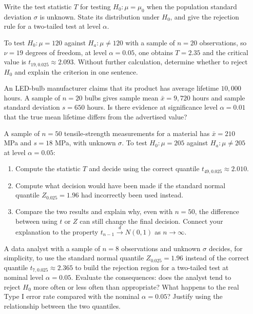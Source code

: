 \begin{problema}\label{prob:b3d462b}
Write the test statistic $T$ for testing $H_0:\mu=\mu_0$ when the population standard deviation $\sigma$ is unknown. State its distribution under $H_0$, and give the rejection rule for a two-tailed test at level $\alpha$.
\end{problema}

\begin{problema}\label{prob:313cd70}
To test $H_0:\mu=120$ against $H_a:\mu\ne120$ with a sample of $n=20$ observations, so $\nu=19$ degrees of freedom, at level $\alpha=0.05$, one obtains $T=2.35$ and the critical value is $t_{19,0.025}\approx2.093$. Without further calculation, determine whether to reject $H_0$ and explain the criterion in one sentence.
\end{problema}

\begin{problema}\label{prob:50f5282}
An LED-bulb manufacturer claims that its product has average lifetime $10{,}000$ hours. A sample of $n=20$ bulbs gives sample mean $\bar x=9{,}720$ hours and sample standard deviation $s=650$ hours. Is there evidence at significance level $\alpha=0.01$ that the true mean lifetime differs from the advertised value?
\end{problema}

\begin{problema}\label{prob:8d10618}
A sample of $n=50$ tensile-strength measurements for a material has $\bar x=210$ MPa and $s=18$ MPa, with unknown $\sigma$. To test $H_0:\mu=205$ against $H_a:\mu\ne205$ at level $\alpha=0.05$:
\begin{enumerate}[label=(\alph*)]
	\item Compute the statistic $T$ and decide using the correct quantile $t_{49,0.025}\approx2.010$.
	\item Compute what decision would have been made if the standard normal quantile $Z_{0.025}=1.96$ had incorrectly been used instead.
	\item Compare the two results and explain why, even with $n=50$, the difference between using $t$ or $Z$ can still change the final decision. Connect your explanation to the property $t_{n-1}\xrightarrow{d}N(0,1)$ as $n\to\infty$.
\end{enumerate}
\end{problema}

\begin{problema}\label{prob:1faa4e6}
A data analyst with a sample of $n=8$ observations and unknown $\sigma$ decides, for simplicity, to use the standard normal quantile $Z_{0.025}=1.96$ instead of the correct quantile $t_{7,0.025}\approx2.365$ to build the rejection region for a two-tailed test at nominal level $\alpha=0.05$. Evaluate the consequences: does the analyst tend to reject $H_0$ more often or less often than appropriate? What happens to the real Type I error rate compared with the nominal $\alpha=0.05$? Justify using the relationship between the two quantiles.
\end{problema}

